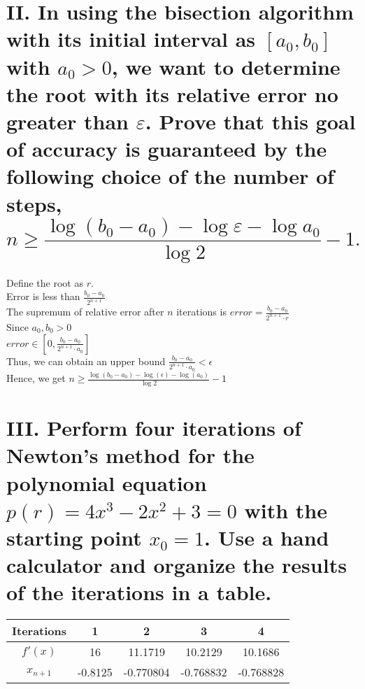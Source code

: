 \documentclass[a4paper]{article}
\begin{document}
\section*{II. In using the bisection algorithm with its initial interval as \([a_0, b_0]\) with \(a_0 > 0\), we want to determine the root with its relative error no greater than \(\varepsilon\). Prove that this goal of accuracy is guaranteed by the following choice of the number of steps,
\[
n \geq \frac{\log(b_0 - a_0) - \log \varepsilon - \log a_0}{\log 2} - 1.
\]}
Define the root as \( r \).\\
Error is less than \( \frac{b_0-a_0}{2^{n+1}} \)\\
The supremum of relative error after \( n \) iterations is \( error = \frac{b_0-a_0}{2^{n+1} \cdot r} \)\\
Since \( a_0, b_0 > 0 \)\\
    \( error \in [0, \frac{b_0-a_0}{2^{n+1} \cdot a_0}] \)\\
Thus, we can obtain an upper bound \( \frac{b_0-a_0}{2^{n+1} \cdot a_0} < \epsilon \)\\
Hence, we get \( n \geq \frac{\log(b_0-a_0) - \log(\epsilon) - \log(a_0)}{\log 2} - 1 \)

\section*{III. Perform four iterations of Newton's method for the polynomial equation \( p(r) = 4x^3 - 2x^2 + 3 = 0 \) with the starting point \( x_0 = 1 \). Use a hand calculator and organize the results of the iterations in a table.}

\noindent 
\begin{center}
    \begin{tabular}{|c|c|c|c|c|}
        \hline
        Iterations & 1 & 2 & 3 & 4 \\ \hline
        \( f'(x) \) & 16 & 11.1719 & 10.2129 & 10.1686 \\ \hline
        \( x_{n+1} \) & -0.8125 & -0.770804 & -0.768832 & -0.768828 \\ \hline
    \end{tabular}
\end{center}
\end{document}
